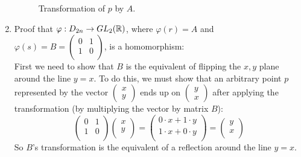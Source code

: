 \documentclass[12pt]{article}
\begin{document}
\begin{enumerate}[label=\textbf{\alph*.}]
\begin{figure}[H]
\begin{tikzpicture}[scale=2.5]
                    \end{tikzpicture}
            
                    \caption{\label{fig:figure1} Transformation of $p$ by $A$.}
                \end{figure}
        \item 
            Proof that $\varphi: D_{2n} \to GL_2(\rbb)$,
            where $\varphi(r) = A$ and $\varphi(s) = B =
            \begin{pmatrix}
                0 & 1 \\
                1 & 0 \\
            \end{pmatrix}$,
            is a homomorphism: \\
            First we need to show that $B$ is the equivalent of flipping
            the $x, y$ plane around the line $y = x$.
            To do this, we must show that an arbitrary point $p$
            represented by the vector $\begin{pmatrix} x \\ y \end{pmatrix}$
            ends up on $\begin{pmatrix} y \\ x \end{pmatrix}$
            after applying the transformation
            (by multiplying the vector by matrix $B$):
            \[  \begin{pmatrix}
                0 & 1 \\
                1 & 0 \\
            \end{pmatrix} 
            \begin{pmatrix}
                x \\
                y \\
            \end{pmatrix} 
            = \begin{pmatrix}
                0 \cdot x + 1 \cdot y \\
                1 \cdot x + 0 \cdot y \\
            \end{pmatrix} 
            =  \begin{pmatrix}
                y \\
                x \\
            \end{pmatrix} \]
            So $B$'s transformation is the equivalent of a reflection 
            around the line $y = x$.
        

\end{enumerate}
\end{document}
